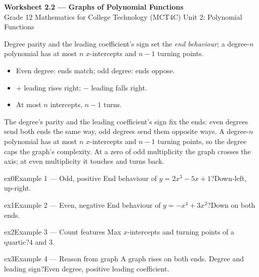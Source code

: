 \documentclass[11pt]{article}
\begin{document}
\begin{center}
{\LARGE\bfseries\color{titleblue}Worksheet 2.2 --- Graphs of Polynomial Functions}\\[2pt]
{\small Grade 12 Mathematics for College Technology (MCT4C) \textperiodcentered{} Unit 2: Polynomial Functions}
\end{center}

\begin{ideabox}
Degree parity and the leading coefficient's sign set the \emph{end behaviour}; a degree-$n$ polynomial has at most $n$ $x$-intercepts and $n-1$ turning points.
\begin{itemize}[leftmargin=*,itemsep=2pt]
  \item Even degree: ends match; odd degree: ends oppose.
  \item $+$ leading rises right; $-$ leading falls right.
  \item At most $n$ intercepts, $n-1$ turns.
\end{itemize}
\end{ideabox}

\begin{learnbox}
The degree's parity and the leading coefficient's sign fix the ends: even degrees send both ends the same way, odd degrees send them opposite ways.
A degree-$n$ polynomial has at most $n$ $x$-intercepts and $n-1$ turning points, so the degree caps the graph's complexity.
At a zero of odd multiplicity the graph crosses the axis; at even multiplicity it touches and turns back.
\end{learnbox}


\begin{example}{ex0}{Example 1 --- Odd, positive}
End behaviour of $y=2x^3-5x+1$?\soln Down-left, up-right.
\end{example}

\begin{example}{ex1}{Example 2 --- Even, negative}
End behaviour of $y=-x^4+3x^2$?\soln Down on both ends.
\end{example}

\begin{example}{ex2}{Example 3 --- Count features}
Max $x$-intercepts and turning points of a quartic?\soln $4$ and $3$.
\end{example}

\begin{example}{ex3}{Example 4 --- Reason from graph}
A graph rises on both ends. Degree and leading sign?\soln Even degree, positive leading coefficient.
\end{example}
\end{document}
